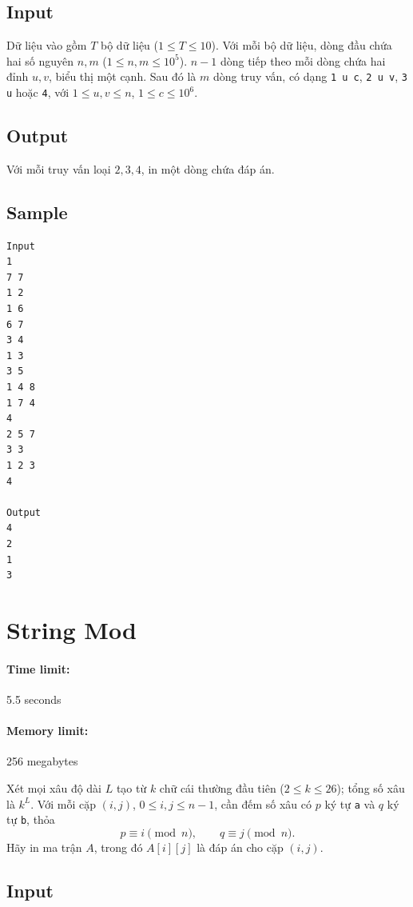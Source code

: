 \documentclass[11pt]{article}
\begin{document}
\subsection*{Input}

Dữ liệu vào gồm \(T\) bộ dữ liệu (\(1\le T\le 10\)). Với mỗi bộ dữ liệu, dòng đầu
chứa hai số nguyên \(n,m\) (\(1\le n,m\le 10^5\)). \(n-1\) dòng tiếp theo mỗi
dòng chứa hai đỉnh \(u,v\), biểu thị một cạnh. Sau đó là \(m\) dòng truy vấn,
có dạng \texttt{1 u c}, \texttt{2 u v}, \texttt{3 u} hoặc \texttt{4}, với
\(1\le u,v\le n\), \(1\le c\le 10^6\).

\subsection*{Output}

Với mỗi truy vấn loại \(2,3,4\), in một dòng chứa đáp án.

\subsection*{Sample}

\begin{verbatim}
Input
1
7 7
1 2
1 6
6 7
3 4
1 3
3 5
1 4 8
1 7 4
4
2 5 7
3 3
1 2 3
4

Output
4
2
1
3
\end{verbatim}

\section{String Mod}

\paragraph{Time limit:} 5.5 seconds
\paragraph{Memory limit:} 256 megabytes

Xét mọi xâu độ dài \(L\) tạo từ \(k\) chữ cái thường đầu tiên
(\(2\le k\le 26\)); tổng số xâu là \(k^L\). Với mỗi cặp
\((i,j)\), \(0\le i,j\le n-1\), cần đếm số xâu có \(p\) ký tự \texttt{a} và
\(q\) ký tự \texttt{b}, thỏa
\[
  p\equiv i\pmod n,\qquad q\equiv j\pmod n.
\]
Hãy in ma trận \(A\), trong đó \(A[i][j]\) là đáp án cho cặp \((i,j)\).

\subsection*{Input}
\end{document}
